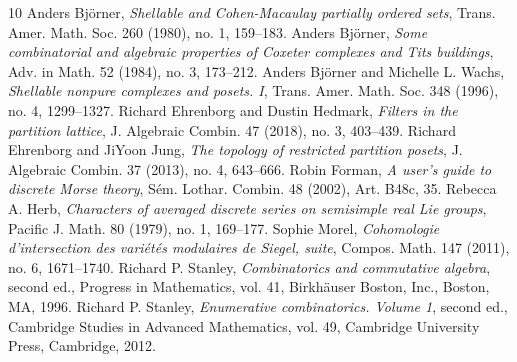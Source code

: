 \begin{thebibliography}{10}
 Anders Bj\"orner, \emph{Shellable and Cohen-Macaulay partially ordered sets}, Trans. Amer. Math. Soc. 260 (1980), no. 1, 159--183.
 Anders Bj\"orner, \emph{Some combinatorial and algebraic properties of Coxeter complexes and Tits buildings}, Adv. in Math. 52 (1984), no. 3, 173--212.
 Anders Bj\"orner and Michelle L. Wachs, \emph{Shellable nonpure complexes and posets. I}, Trans. Amer. Math. Soc. 348 (1996), no. 4, 1299--1327.
 Richard Ehrenborg and Dustin Hedmark, \emph{Filters in the partition lattice}, J. Algebraic Combin. 47 (2018), no. 3, 403--439.
 Richard Ehrenborg and JiYoon Jung, \emph{The topology of restricted partition posets}, J. Algebraic Combin. 37 (2013), no. 4, 643--666.
 Robin Forman, \emph{A user's guide to discrete Morse theory}, S\'em. Lothar. Combin. 48 (2002), Art. B48c, 35.
 Rebecca A. Herb, \emph{Characters of averaged discrete series on semisimple real Lie groups}, Pacific J. Math. 80 (1979), no. 1, 169--177.
 Sophie Morel, \emph{Cohomologie d'intersection des vari\'et\'es modulaires de Siegel, suite}, Compos. Math. 147 (2011), no. 6, 1671--1740.
 Richard P. Stanley, \emph{Combinatorics and commutative algebra}, second ed., Progress in Mathematics, vol. 41, Birkh\"auser Boston, Inc., Boston, MA, 1996.
 Richard P. Stanley, \emph{Enumerative combinatorics. Volume 1}, second ed., Cambridge Studies in Advanced Mathematics, vol. 49, Cambridge University Press, Cambridge, 2012.
\end{thebibliography}
